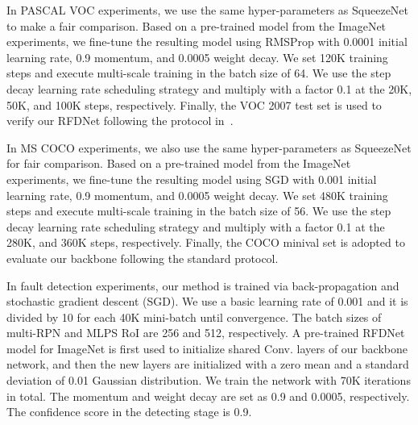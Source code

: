 In PASCAL VOC experiments, we use the same hyper-parameters as SqueezeNet to make a fair comparison. Based on a pre-trained model from the ImageNet experiments, we fine-tune the resulting model using RMSProp with 0.0001 initial learning rate, 0.9 momentum, and 0.0005 weight decay. We set 120K training steps and execute multi-scale training in the batch size of 64. We use the step decay learning rate scheduling strategy and multiply with a factor 0.1 at the 20K, 50K, and 100K steps, respectively. Finally, the VOC 2007 test set is used to verify our RFDNet following the protocol in~\cite{RenHGS15}.

In MS COCO experiments, we also use the same hyper-parameters as SqueezeNet for fair comparison. Based on a pre-trained model from the ImageNet experiments, we fine-tune the resulting model using SGD with 0.001 initial learning rate, 0.9 momentum, and 0.0005 weight decay. We set 480K training steps and execute multi-scale training in the batch size of 56. We use the step decay learning rate scheduling strategy and multiply with a factor 0.1 at the 280K, and 360K steps, respectively. Finally, the COCO minival set is adopted to evaluate our backbone following the standard protocol.

In fault detection experiments, our method is trained via back-propagation and stochastic gradient descent (SGD). We use a basic learning rate of 0.001 and it is divided by 10 for each 40K mini-batch until convergence. The batch sizes of  multi-RPN and MLPS RoI are 256 and 512, respectively. A pre-trained RFDNet model for ImageNet is first used to initialize shared Conv. layers of our backbone network, and then the new layers are initialized with a zero mean and a standard deviation of 0.01 Gaussian distribution. We train the network with 70K iterations in total. The momentum and weight decay are set as 0.9 and 0.0005, respectively. The confidence score in the detecting stage is 0.9.

